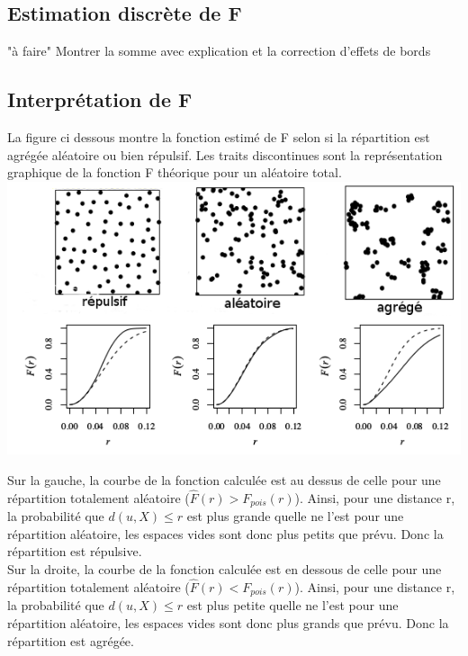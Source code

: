 \documentclass[french,12pt,a4paper]{report}
\begin{document}
\subsection{Estimation discrète de F}
"à faire"
Montrer la somme avec explication et la correction d'effets de bords


\subsection{Interprétation de F}
La figure ci dessous montre la fonction estimé de F selon si la répartition est agrégée aléatoire ou bien répulsif. Les traits discontinues sont la représentation graphique de la fonction F théorique pour un aléatoire total.\\

\includegraphics[scale=0.7]{images/interpret.png}

Sur la gauche, la courbe de la fonction calculée est au dessus de celle pour une répartition totalement aléatoire (\begin{math}\hat{F}(r) > F_{pois}(r) \end{math}). Ainsi, pour une distance r, la probabilité que \begin{math} d(u,X) \leq r \end{math} est plus grande quelle ne l'est pour une répartition aléatoire, les espaces vides sont donc plus petits que prévu. Donc la répartition est répulsive.\\
\indent
Sur la droite, la courbe de la fonction calculée est en dessous de celle pour une répartition totalement aléatoire (\begin{math}\hat{F}(r) < F_{pois}(r) \end{math}). Ainsi, pour une distance r, la probabilité que \begin{math} d(u,X) \leq r \end{math} est plus petite quelle ne l'est pour une répartition aléatoire, les espaces vides sont donc plus grands que prévu. Donc la répartition est agrégée.
\end{document}
